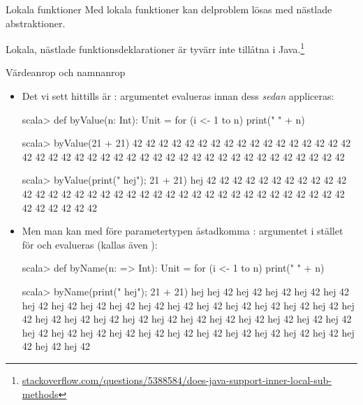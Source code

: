 \begin{Slide}{Lokala funktioner}\SlideFontSmall
Med lokala funktioner kan delproblem lösas med nästlade abstraktioner. 


Lokala, nästlade funktionsdeklarationer är tyvärr inte tillåtna i Java.\footnote{\href{http://stackoverflow.com/questions/5388584/does-java-support-inner-local-sub-methods}{stackoverflow.com/questions/5388584/does-java-support-inner-local-sub-methods}} 

\end{Slide} 



\begin{Slide}{Värdeanrop och namnanrop}\SlideFontSmall
\begin{itemize}
\item Det vi sett hittills är : argumentet evalueras  innan dess  \emph{sedan} appliceras:
\begin{REPL}
scala> def byValue(n: Int): Unit = for (i <- 1 to n) print(" " + n)

scala> byValue(21 + 21)
 42 42 42 42 42 42 42 42 42 42 42 42 42 42 42 42 42 42 42 42 42 42 42 42 42 42 42 42 42 42 42 42 42 42 42 42 42 42 42 42 42 42

scala> byValue({print(" hej"); 21 + 21})
 hej 42 42 42 42 42 42 42 42 42 42 42 42 42 42 42 42 42 42 42 42 42 42 42 42 42 42 42 42 42 42 42 42 42 42 42 42 42 42 42 42 42 42
\end{REPL}
\item Men man kan med \code{=>} före parametertypen åstadkomma : argumentet  i stället för  och evalueras  (kallas även ):
\begin{REPL}
scala> def byName(n: => Int): Unit = for (i <- 1 to n) print(" " + n)

scala> byName({print(" hej"); 21 + 21})
 hej hej 42 hej 42 hej 42 hej 42 hej 42 hej 42 hej 42 hej 42 hej 42 hej 42 hej 42 hej 42 hej 42 hej 42 hej 42 hej 42 hej 42 hej 42 hej 42 hej 42 hej 42 hej 42 hej 42 hej 42 hej 42 hej 42 hej 42 hej 42 hej 42 hej 42 hej 42 hej 42 hej 42 hej 42 hej 42 hej 42 hej 42 hej 42 hej 42 hej 42 hej 42 hej 42
\end{REPL}

\end{itemize}
\end{Slide} 

